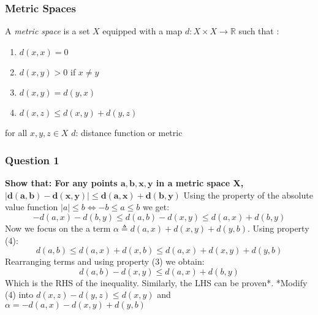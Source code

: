 \begin{frame}
    \frametitle{Metric Spaces}
A \textit{metric space} is a set $X$ equipped with a map $d: X\times X \rightarrow \mathbb{R}$ such that :
\begin{enumerate}
    \item $d(x,x) = 0$
    \item $d(x,y)>0$ if $x\neq y$
    \item $d(x,y) = d(y,x)$
    \item $d(x,z) \leq d(x,y)+d(y,z)$
\end{enumerate}
    
for all $x,y,z \in X$ \hfill\break
\hfill\break
$d$: distance function or metric
\end{frame}

\begin{frame}
\frametitle{Question 1}
\textbf{Show that: For any points $\bm{a,b,x,y}$ in a metric space X,} $\bm{|d(a,b) - d(x,y)| \leq d(a,x) + d(b,y)}$\hfill\break
\hfill\break
Using the property of the absolute value function $|a|\leq b \iff -b\leq a \leq b$ we get:\hfill\break
\begin{equation*}
- d(a,x) - d(b,y) \leq d(a,b) - d(x,y) \leq  d(a,x) + d(b,y)
\end{equation*}
\hfill\break
Now we focus on the a term $\alpha \triangleq d(a,x) + d(x, y)  + d(y, b)$. Using property (4):
\begin{equation*}
d(a,b) \leq d(a,x) + d(x, b) \leq  d(a,x) + d(x, y)  + d(y, b) 
\end{equation*}
Rearranging terms and using property (3) we obtain:
\begin{equation*}
d(a,b) - d(x,y) \leq  d(a,x) + d(b,y)
\end{equation*}
Which is the RHS of the inequality. Similarly, the LHS can be proven*. \hfill\break
*Modify (4) into $d(x,z) - d(y,z) \leq d(x,y)$ and $\alpha = -d(a,x) -d(x, y)  + d(y, b)$
\end{frame}

